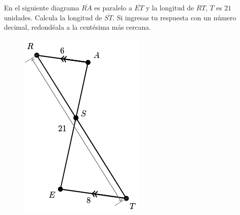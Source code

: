 \question[10] En el siguiente diagrama $\overline{RA}$ es paralelo a $\overline{ET}$ y la longitud de $RT$, $T$ es $21$ unidades.
Calcula la longitud de $\overline{ST}$.
Si ingresas tu respuesta con un número decimal, redondéala a la centésima más cercana.


\begin{minipage}{\textwidth}
        \begin{minipage}{0.45\textwidth}
        \begin{solutionbox}{6cm}
           
        \end{solutionbox}
    \end{minipage}\hfill
    \begin{minipage}{0.45\textwidth}
        \begin{figure}[H]
            \centering
            \includegraphics[width =0.9\linewidth ]{Images/triang_sem05}
            \caption{}
            \label{fig:triang_sem05}
        \end{figure}

    \end{minipage}
\end{minipage}